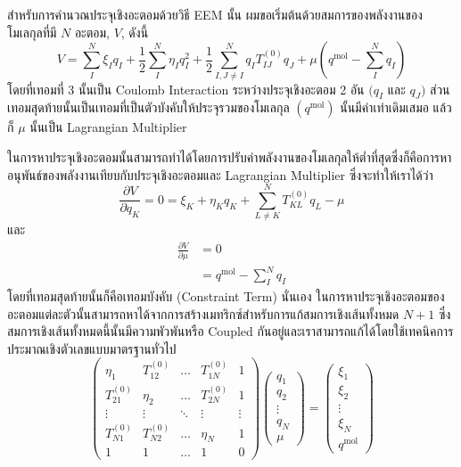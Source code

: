 สำหรับการคำนวณประจุเชิงอะตอมด้วยวิธี EEM นั้น ผมขอเริ่มต้นด้วยสมการของพลังงานของโมเลกุลที่มี $N$ อะตอม, $V$, ดังนี้
%
\begin{equation}
  V
  =
  \sum_I^N \xi_I q_I+\frac{1}{2}
  \sum_I^N \eta_I q_I^2+\frac{1}{2}
  \sum_{I, J \neq I}^N q_I T_{I J}^{(0)} q_J
  + \mu\left(q^{\mathrm{mol}}-\sum_I^N q_I\right)
\end{equation}
%
โดยที่เทอมที่ 3 นั้นเป็น Coulomb Interaction ระหว่างประจุเชิงอะตอม 2 อัน $(q_I$ และ $q_J)$ ส่วนเทอมสุดท้ายนั้นเป็นเทอมที่เป็นตัวบังคับให้ประจุรวมของโมเลกุล $(q^{\mathrm{mol}})$ นั้นมีค่าเท่าเดิมเสมอ แล้วก็ $\mu$ นั้นเป็น Lagrangian Multiplier

ในการหาประจุเชิงอะตอมนั้นสามารถทำได้โดยการปรับค่าพลังงานของโมเลกุลให้ต่ำที่สุดซึ่งก็คือการหาอนุพันธ์ของพลังงานเทียบกับประจุเชิงอะตอมและ Lagrangian Multiplier ซึ่งจะทำให้เราได้ว่า
%
\begin{equation}
  \frac{\partial V}{\partial q_K}
  =
  0
  = \xi_K+\eta_K q_K+\sum_{L \neq K}^N T_{K L}^{(0)} q_L-\mu
\end{equation}
%
และ
%
\begin{align}
  \frac{\partial V}{\partial \mu}
   & =
  0    \\
   & =
  q^{\mathrm{mol}}-\sum_I^N q_I
\end{align}
%
โดยที่เทอมสุดท้ายนั้นก็คือเทอมบังคับ (Constraint Term) นั่นเอง ในการหาประจุเชิงอะตอมของอะตอมแต่ละตัวนั้นสามารถหาได้จากการสร้างเมทริกซ์สำหรับการแก้สมการเชิงเส้นทั้งหมด $N+1$ ซึ่งสมการเชิงเส้นทั้งหมดนี้นั้นมีความพัวพันหรือ Coupled กันอยู่และเราสามารถแก้ได้โดยใช้เทคนิคการประมาณเชิงตัวเลขแบบมาตรฐานทั่วไป
%
\begin{equation}
  \left(\begin{array}{ccccc}
    \eta_1        & T_{12}^{(0)}  & \ldots & T_{1 N}^{(0)} & 1      \\
    T_{21}^{(0)}  & \eta_2        & \ldots & T_{2 N}^{(0)} & 1      \\
    \vdots        & \vdots        & \ddots & \vdots        & \vdots \\
    T_{N 1}^{(0)} & T_{N 2}^{(0)} & \ldots & \eta_N        & 1      \\
    1             & 1             & \ldots & 1             & 0
  \end{array}\right)\left(\begin{array}{c}
    q_1    \\
    q_2    \\
    \vdots \\
    q_N    \\
    \mu
  \end{array}\right)
  =
  \left(\begin{array}{c}
    \xi_1  \\
    \xi_2  \\
    \vdots \\
    \xi_N  \\
    q^{\mathrm{mol}}
  \end{array}\right)
\end{equation}
